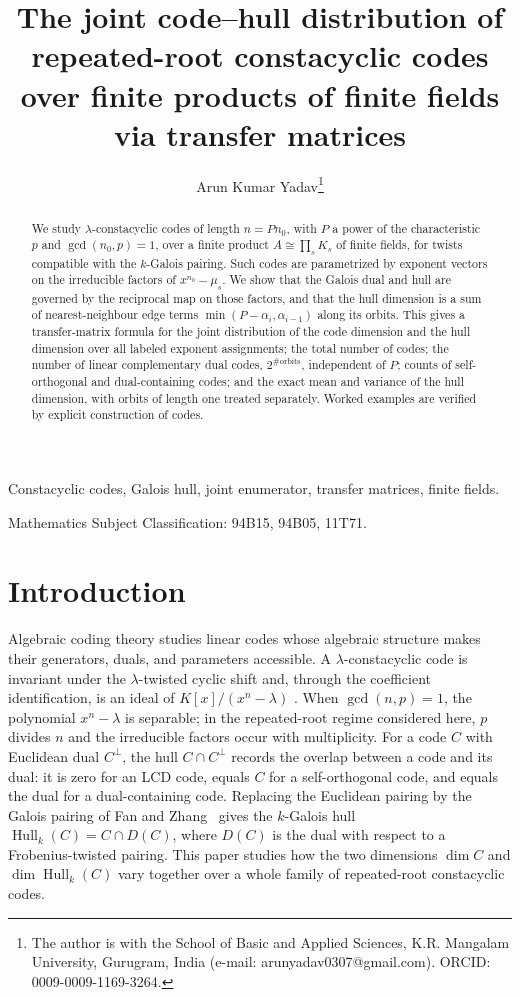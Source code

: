 \documentclass[10pt,journal,draftclsnofoot,onecolumn]{IEEEtran}
\title{The joint code--hull distribution of repeated-root constacyclic codes
over finite products of finite fields via transfer matrices}
\author{Arun Kumar Yadav\thanks{The author is with the School of Basic and Applied Sciences, K.R. Mangalam University, Gurugram, India (e-mail: arunyadav0307@gmail.com). ORCID: 0009-0009-1169-3264.}}
\theoremstyle{definition}
\theoremstyle{remark}
\newcommand{\Hull}{\operatorname{Hull}}
\begin{document}
\maketitle

\begin{abstract}
We study \(\lambda\)-constacyclic codes of length \(n = P n_0\), with
\(P\) a power of the characteristic \(p\) and \(\gcd(n_0, p) = 1\), over a
finite product \(A \cong \prod_s K_s\) of finite fields, for twists
compatible with the \(k\)-Galois pairing. Such codes are parametrized by
exponent vectors on the irreducible factors of \(x^{n_0} - \mu_s\). We
show that the Galois dual and hull are governed by the reciprocal
map on those factors, and that the hull dimension is a sum of
nearest-neighbour edge terms \(\min(P - \alpha_i, \alpha_{i-1})\) along
its orbits. This gives a transfer-matrix formula for the joint
distribution of the code dimension and the hull dimension over all
labeled exponent assignments; the total number of codes; the number of
linear complementary dual codes, \(2^{\#\mathrm{orbits}}\), independent of \(P\); counts of
self-orthogonal and dual-containing codes; and the exact mean and
variance of the hull dimension, with orbits of length one treated
separately. Worked examples are verified by explicit construction of
codes.
\end{abstract}

\begin{IEEEkeywords}
Constacyclic codes, Galois hull, joint enumerator, transfer matrices, finite fields.
\end{IEEEkeywords}

\noindent Mathematics Subject Classification: 94B15, 94B05, 11T71.

\section{Introduction}

Algebraic coding theory studies linear codes whose algebraic structure
makes their generators, duals, and parameters accessible. A
\(\lambda\)-constacyclic code is invariant under the
\(\lambda\)-twisted cyclic shift and, through the coefficient
identification, is an ideal of \(K[x]/(x^n-\lambda)\)
\cite{HP2003, MS1977}. When \(\gcd(n,p)=1\), the polynomial
\(x^n-\lambda\) is separable; in the repeated-root regime considered
here, \(p\) divides \(n\) and the irreducible factors occur with
multiplicity. For a code \(C\) with Euclidean dual \(C^\perp\), the
hull \(C \cap C^\perp\) records the overlap between a code and its
dual: it is zero for an LCD code, equals \(C\) for a self-orthogonal
code, and equals the dual for a dual-containing code. Replacing the
Euclidean pairing by the Galois pairing of Fan and
Zhang~\cite{FZ2017} gives the \(k\)-Galois hull
\(\Hull_k(C) = C \cap D(C)\), where \(D(C)\) is the dual with respect
to a Frobenius-twisted pairing. This paper studies how the two
dimensions \(\dim C\) and \(\dim \Hull_k(C)\) vary together over a
whole family of repeated-root constacyclic codes.
\end{document}
